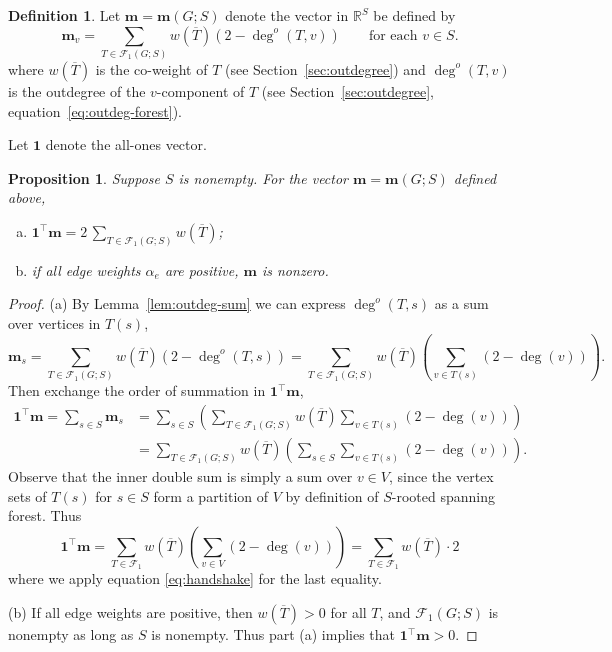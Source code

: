 \documentclass{amsart}
\newtheorem{prop}[thm]{Proposition}
\theoremstyle{definition}
\newtheorem{dfn}[thm]{Definition}
\newcommand{\RR}{\mathbb{R}}
\newcommand{\bone}{\mathbf{1}}
\newcommand{\boldm}{\mathbf{m}}
\newcommand{\tr}{\intercal}
\newcommand{\trees}{\mathcal{F}_1}
\newcommand{\degout}{\deg^o}
\begin{document}
\begin{dfn}
\label{dfn:m-vector}
Let $\boldm = \boldm(G;S)$ denote the vector in $\RR^S$ be defined by
\begin{equation}
\label{eq:m-vector}
\boldm_v =  \sum_{T \in \trees(G;S)} w(\overline{T}) (2 - \degout(T,v))
\qquad\text{for each }v \in S.
\end{equation}
where $w(\overline{T})$ is the co-weight of $T$ (see Section~\ref{sec:outdegree})
and $\degout(T,v)$ is the outdegree of the $v$-component of $T$ (see Section~\ref{sec:outdegree}, equation~\eqref{eq:outdeg-forest}).
\end{dfn}

Let $\bone$ denote the all-ones vector.
\begin{prop}
\label{prop:m-sum}
Suppose $S$ is nonempty.
For the vector $\boldm = \boldm(G; S)$ defined above, 
\begin{enumerate}[(a)]
\item 
$\displaystyle \bone^\tr \boldm = 2 \,\sum_{T \in \trees(G;S)} w(\overline{T})$;

\item 
if all edge weights $\alpha_e$ are positive, $\boldm$ is nonzero.
\end{enumerate}
\end{prop}
\begin{proof}
(a)
By Lemma~\ref{lem:outdeg-sum} we can express $\degout(T, s)$ as a sum over vertices in $T(s)$,
\[
	\boldm_s = \sum_{T \in \trees(G;S)} w(\overline{T}) (2 - \degout (T,s))
= \sum_{T \in \trees(G;S)} w(\overline{T}) \left( \sum_{v \in T(s)}(2 - \deg(v))\right).
\]
Then exchange the order of summation in $\bone^\tr \boldm$,
\begin{align}
	\bone^\tr \boldm = \sum_{s\in S} \boldm_s &= \sum_{s \in S} \left( \sum_{T \in \trees(G;S)} w(\overline{T}) \sum_{v \in T(s)}(2 - \deg(v)) \right) \\
	&= \sum_{T \in \trees(G;S)} w(\overline{T}) \left( \sum_{s\in S} \sum_{v \in T(s)} (2 - \deg(v)) \right) .
\end{align}
Observe that the inner double sum is simply a sum over $v \in V$,
since the vertex sets of $T(s)$ for $s \in S$ form a partition of $V$ by definition of $S$-rooted spanning forest.
Thus 
\[
	\bone^\tr \boldm = \sum_{T \in \trees} w(\overline{T}) \left( \sum_{v \in V} (2 - \deg(v))\right)
	= \sum_{T \in \trees} w(\overline{T}) \cdot 2 
\]
where we apply 
equation \eqref{eq:handshake} for the last equality.

(b) 
If all edge weights are positive, then $w(\overline{T}) > 0$ for all $T$, and $\trees(G; S)$ is nonempty as long as $S$ is nonempty. 
Thus part (a) implies that $\bone^\tr \boldm > 0$.
\end{proof}
\end{document}
